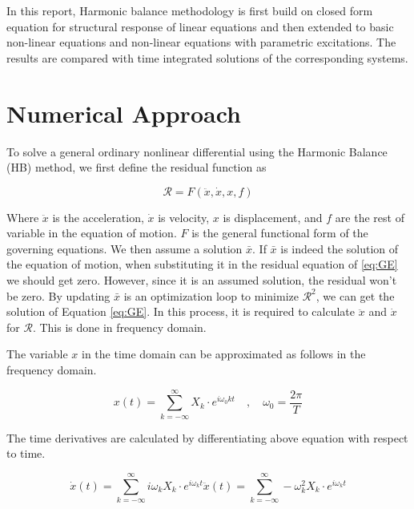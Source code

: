\documentclass[12pt, a4paper]{extarticle}
\begin{document}
In this report, Harmonic balance methodology is first build on closed form equation for structural response of linear equations and then extended to basic non-linear equations and non-linear equations with parametric excitations. The results are compared with time integrated solutions of the corresponding systems.

\section{Numerical Approach}

To solve a general ordinary nonlinear differential using the Harmonic Balance (HB) method, we first define the residual function as

\begin{equation}\label{eq:GE}
	\mathcal{R} = F(\ddot{x}, \dot{x}, x, f)
\end{equation}

Where $\ddot{x}$ is the acceleration, $\dot{x}$ is velocity, $x$ is displacement, and $f$ are the rest of variable in the equation of motion. $F$ is the general functional form of the governing equations. We then assume a solution $\bar{x}$. If $\bar{x}$ is indeed the solution of the equation of motion, when substituting it in the residual equation of \eqref{eq:GE} we should get zero. However, since it is an assumed solution, the residual won't be zero. By updating $\bar{x}$ is an optimization loop to minimize $\mathcal{R}^2$, we can get the solution of Equation \eqref{eq:GE}. In this process, it is required to calculate $\ddot{x}$ and $\dot{x}$ for $\mathcal{R}$. This is done in frequency domain.

The variable $x$ in the time domain can be approximated as follows in the frequency domain.

\begin{equation}\label{eq:displacement}
	x(t) = 
	\sum_{k=-\infty}^{\infty}
	X_k \cdot e^{i \omega_0 k t} \quad , \quad \omega_0 = \frac{2\pi}{T}
\end{equation}

The time derivatives are calculated by differentiating above equation with respect to time.

\begin{subequations}
\begin{equation}\label{eq:velocity}
	\dot{x}(t) = \sum_{k=-\infty}^{\infty} i \omega_k X_k \cdot e^{i \omega_k t}
\end{equation}
\begin{equation}\label{eq:acceleration}
	\ddot{x}(t) = \sum_{k=-\infty}^{\infty} -\omega_k^2 X_k \cdot e^{i \omega_k t}
\end{equation}
\end{subequations}
\end{document}
